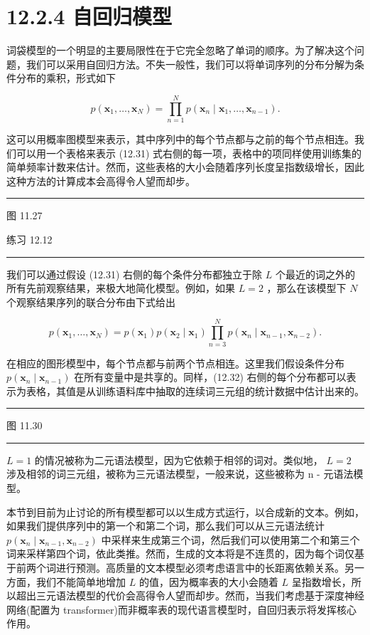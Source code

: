 \documentclass[10pt]{report}
\newcommand{\HRule}{\begin{center}\rule{0.9\linewidth}{0.2mm}\end{center}}
\begin{document}
\section*{12.2.4 自回归模型}

词袋模型的一个明显的主要局限性在于它完全忽略了单词的顺序。为了解决这个问题，我们可以采用自回归方法。不失一般性，我们可以将单词序列的分布分解为条件分布的乘积，形式如下

\[
p\left( {{\mathbf{x}}_{1},\ldots ,{\mathbf{x}}_{N}}\right)  = \mathop{\prod }\limits_{{n = 1}}^{N}p\left( {{\mathbf{x}}_{n} \mid  {\mathbf{x}}_{1},\ldots ,{\mathbf{x}}_{n - 1}}\right) . \tag{12.31}
\]

这可以用概率图模型来表示，其中序列中的每个节点都与之前的每个节点相连。我们可以用一个表格来表示 (12.31) 式右侧的每一项，表格中的项同样使用训练集的简单频率计数来估计。然而，这些表格的大小会随着序列长度呈指数级增长，因此这种方法的计算成本会高得令人望而却步。

\HRule

图 11.27

练习 12.12

\HRule

我们可以通过假设 (12.31) 右侧的每个条件分布都独立于除 \(L\) 个最近的词之外的所有先前观察结果，来极大地简化模型。例如，如果 \(L = 2\) ，那么在该模型下 \(N\) 个观察结果序列的联合分布由下式给出

\[
p\left( {{\mathbf{x}}_{1},\ldots ,{\mathbf{x}}_{N}}\right)  = p\left( {\mathbf{x}}_{1}\right) p\left( {{\mathbf{x}}_{2} \mid  {\mathbf{x}}_{1}}\right) \mathop{\prod }\limits_{{n = 3}}^{N}p\left( {{\mathbf{x}}_{n} \mid  {\mathbf{x}}_{n - 1},{\mathbf{x}}_{n - 2}}\right) . \tag{12.32}
\]

在相应的图形模型中，每个节点都与前两个节点相连。这里我们假设条件分布 \(p\left( {{\mathbf{x}}_{n} \mid  {\mathbf{x}}_{n - 1}}\right)\) 在所有变量中是共享的。同样，(12.32) 右侧的每个分布都可以表示为表格，其值是从训练语料库中抽取的连续词三元组的统计数据中估计出来的。

\HRule

图 11.30

\HRule

\(L = 1\) 的情况被称为二元语法模型，因为它依赖于相邻的词对。类似地， \(L = 2\) 涉及相邻的词三元组，被称为三元语法模型，一般来说，这些被称为 n - 元语法模型。

本节到目前为止讨论的所有模型都可以以生成方式运行，以合成新的文本。例如，如果我们提供序列中的第一个和第二个词，那么我们可以从三元语法统计 \(p\left( {{\mathbf{x}}_{n} \mid  {\mathbf{x}}_{n - 1},{\mathbf{x}}_{n - 2}}\right)\) 中采样来生成第三个词，然后我们可以使用第二个和第三个词来采样第四个词，依此类推。然而，生成的文本将是不连贯的，因为每个词仅基于前两个词进行预测。高质量的文本模型必须考虑语言中的长距离依赖关系。另一方面，我们不能简单地增加 \(L\) 的值，因为概率表的大小会随着 \(L\) 呈指数增长，所以超出三元语法模型的代价会高得令人望而却步。然而，当我们考虑基于深度神经网络(配置为 transformer)而非概率表的现代语言模型时，自回归表示将发挥核心作用。
\end{document}
